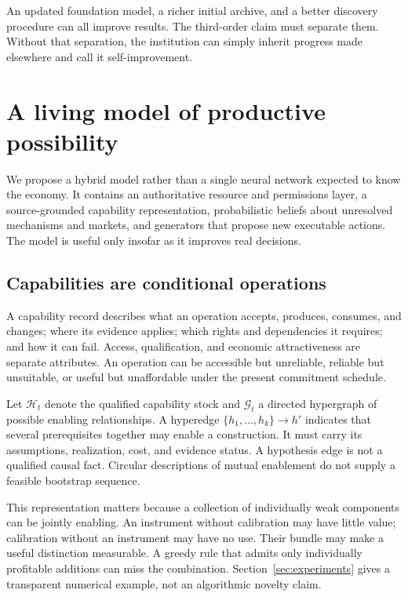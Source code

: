\documentclass[11pt,letterpaper]{article}
\newcommand{\GG}{\mathcal{G}}
\theoremstyle{remark}\newtheorem{remark}{Remark}[section]
\newcommand{\HH}{\mathcal{H}}
\begin{document}
An updated foundation model, a richer initial archive, and a better discovery procedure can all improve results. The third-order claim must separate them. Without that separation, the institution can simply inherit progress made elsewhere and call it self-improvement.

\section{A living model of productive possibility}\label{sec:world}
We propose a hybrid model rather than a single neural network expected to know the economy. It contains an authoritative resource and permissions layer, a source-grounded capability representation, probabilistic beliefs about unresolved mechanisms and markets, and generators that propose new executable actions. The model is useful only insofar as it improves real decisions.

\subsection{Capabilities are conditional operations}
A capability record describes what an operation accepts, produces, consumes, and changes; where its evidence applies; which rights and dependencies it requires; and how it can fail. Access, qualification, and economic attractiveness are separate attributes. An operation can be accessible but unreliable, reliable but unsuitable, or useful but unaffordable under the present commitment schedule.

Let $\HH_t$ denote the qualified capability stock and $\GG_t$ a directed hypergraph of possible enabling relationships. A hyperedge $\{h_1,\ldots,h_k\}\rightarrow h'$ indicates that several prerequisites together may enable a construction. It must carry its assumptions, realization, cost, and evidence status. A hypothesis edge is not a qualified causal fact. Circular descriptions of mutual enablement do not supply a feasible bootstrap sequence.

This representation matters because a collection of individually weak components can be jointly enabling. An instrument without calibration may have little value; calibration without an instrument may have no use. Their bundle may make a useful distinction measurable. A greedy rule that admits only individually profitable additions can miss the combination. Section~\ref{sec:experiments} gives a transparent numerical example, not an algorithmic novelty claim.
\end{document}
